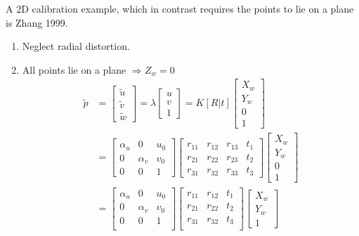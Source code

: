 \documentclass[10pt,a4paper]{scrartcl}
\begin{document}
\begin{multicols*}{2}
A 2D calibration example, which in contrast requires the points to lie on a plane is Zhang 1999.

\begin{enumerate}
\item Neglect radial distortion.
\item All points lie on a plane $\Rightarrow Z_w =0$
\begin{align*}
\tilde{p}&=\begin{bmatrix}
\tilde{u}\\\tilde{v}\\\tilde{w}
\end{bmatrix}=\lambda\begin{bmatrix}
u\\v\\1
\end{bmatrix}=K[R|t]\begin{bmatrix}
X_w\\Y_w\\0\\1
\end{bmatrix}\\
&=\begin{bmatrix}
\alpha_u&0&u_0\\
0&\alpha_v&v_0\\
0&0&1
\end{bmatrix}\begin{bmatrix}
r_{11}&r_{12}&r_{13}&t_1\\
r_{21}&r_{22}&r_{23}&t_2\\
r_{31}&r_{32}&r_{33}&t_3
\end{bmatrix}\begin{bmatrix}
X_w\\Y_w\\0\\1
\end{bmatrix}\\
&=\begin{bmatrix}
\alpha_u&0&u_0\\
0&\alpha_v&v_0\\
0&0&1\\
\end{bmatrix}
\begin{bmatrix}
r_{11}&r_{12}&t_1\\
r_{21}&r_{22}&t_2\\
r_{31}&r_{32}&t_3\\
\end{bmatrix}\begin{bmatrix}
X_w\\Y_w\\1

\end{bmatrix}
\end{align*}
\end{enumerate}
\end{multicols*}
\end{document}
